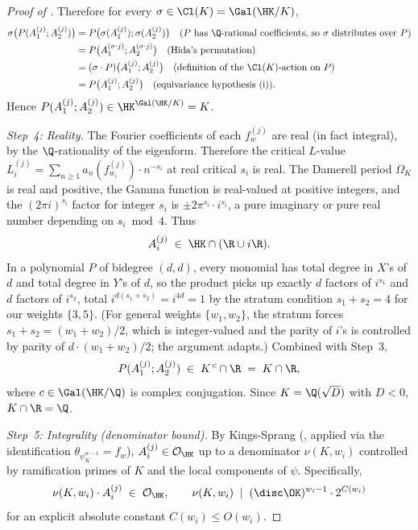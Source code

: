 \begin{proof}[Proof of ]
Therefore for every $\sigma \in \Cl(K) = \Gal(\HK/K)$,
\begin{align*}
\sigma\bigl(P(A_1^{(j)}; A_2^{(j)})\bigr)
&= P\bigl(\sigma(A_1^{(j)}); \sigma(A_2^{(j)})\bigr) \quad
\text{($P$ has $\Q$-rational coefficients, so $\sigma$
distributes over $P$)} \\
&= P\bigl(A_1^{(\sigma \cdot j)}; A_2^{(\sigma \cdot j)}\bigr)
\quad \text{(Hida's permutation)} \\
&= (\sigma \cdot P)\bigl(A_1^{(j)}; A_2^{(j)}\bigr)
\quad \text{(definition of the $\Cl(K)$-action on $P$)} \\
&= P\bigl(A_1^{(j)}; A_2^{(j)}\bigr) \quad
\text{(equivariance hypothesis~(i))}.
\end{align*}
Hence $P(A_1^{(j)}; A_2^{(j)}) \in \HK^{\Gal(\HK/K)} = K$.

\medskip
\noindent\emph{Step~4: Reality.}
The Fourier coefficients of each $f_w^{(j)}$ are real (in fact
integral), by the $\Q$-rationality of the eigenform.
Therefore the critical $L$-value $L_i^{(j)} = \sum_{n \geq 1}
a_n(f_{w_i}^{(j)}) \cdot n^{-s_i}$ at real critical $s_i$ is
real. The Damerell period $\Omega_K$ is real and positive, the
Gamma function is real-valued at positive integers, and the
$(2\pi i)^{s_i}$ factor for integer $s_i$ is $\pm 2\pi^{s_i}
\cdot i^{s_i}$, a pure imaginary or pure real number depending
on $s_i \bmod 4$. Thus
\begin{equation}\label{eq:A-real}
A_i^{(j)} \;\in\; \HK \cap (\R \cup i\R).
\end{equation}
In a polynomial $P$ of bidegree $(d, d)$, every monomial has
total degree in $X$'s of $d$ and total degree in $Y$'s of $d$,
so the product picks up exactly $d$ factors of $i^{s_1}$ and $d$
factors of $i^{s_2}$, total $i^{d(s_1 + s_2)} = i^{4d} = 1$ by
the stratum condition $s_1 + s_2 = 4$ for our weights $\{3, 5\}$.
(For general weights $\{w_1, w_2\}$, the stratum forces $s_1 +
s_2 = (w_1 + w_2)/2$, which is integer-valued and the parity of
$i$'s is controlled by parity of $d \cdot (w_1 + w_2)/2$; the
argument adapts.) Combined with Step~3,
\[
P(A_1^{(j)}; A_2^{(j)}) \;\in\; K^{\,c} \cap \R \;=\; K \cap \R,
\]
where $c \in \Gal(\HK/\Q)$ is complex conjugation. Since
$K = \Q(\sqrt{D})$ with $D < 0$, $K \cap \R = \Q$.

\medskip
\noindent\emph{Step~5: Integrality (denominator bound).}
By Kings-Sprang (, applied via the
identification $\theta_{\psi_K^{w-1}} = f_w$),
$A_i^{(j)} \in \mathcal{O}_{\HK}$ up to a denominator $\nu(K, w_i)$
controlled by ramification primes of $K$ and the local
components of $\psi$. Specifically,
\begin{equation}\label{eq:KS-integrality}
\nu(K, w_i) \cdot A_i^{(j)} \;\in\; \mathcal{O}_{\HK},
\qquad \nu(K, w_i) \;\mid\; (\disc \OK)^{w_i - 1} \cdot 2^{C(w_i)}
\end{equation}
for an explicit absolute constant $C(w_i) \leq O(w_i)$.


\end{proof}
